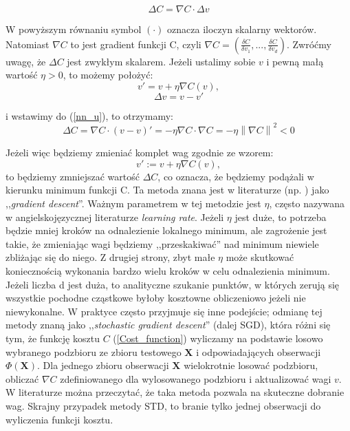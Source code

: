 \documentclass[licencjacka]{pracamgr}
\newcommand{\norm}[1]{\left\lVert#1\right\rVert}
\begin{document}
\begin{equation}
	\label{nn_u}
	\Delta C = \nabla C \cdot \Delta v
\end{equation}
 
W powyższym równaniu symbol $(\cdot)$ oznacza iloczyn skalarny wektorów. Natomiast $\nabla C$ to jest gradient funkcji C, czyli $\nabla C = (\frac{\delta C}{\delta v_{1}},...,\frac{\delta C}{\delta v_{d}} )$. Zwróćmy uwagę, że $\Delta C$ jest zwykłym skalarem. Jeżeli ustalimy sobie $v$ i pewną małą wartość $\eta>0$, to możemy położyć:
$$v' = v + \eta\nabla C(v), $$
$$ \Delta v = v - v'$$
 
i wstawimy do (\ref{nn_u}), to otrzymamy:
$$\Delta C = \nabla C\cdot (v - v)' = -\eta \nabla C\cdot\nabla C = -\eta\norm{\nabla C}^{2} < 0$$
 
Jeżeli więc będziemy zmieniać komplet wag zgodnie ze wzorem:
$$v':=v+\eta\nabla C(v),$$
to będziemy zmniejszać wartość $\Delta C$, co oznacza, że będziemy podążali w kierunku minimum funkcji C. Ta metoda znana jest w literaturze (np. \cite{nn}) jako ,,\textit{gradient descent}''. Ważnym parametrem w tej metodzie jest $\eta$, często nazywana w angielskojęzycznej literaturze \textit{learning rate}. Jeżeli $\eta$ jest duże, to potrzeba będzie mniej kroków na odnalezienie lokalnego minimum, ale zagrożenie jest takie, że zmieniając wagi będziemy ,,przeskakiwać'' nad minimum niewiele zbliżając się do niego. Z drugiej strony, zbyt małe $\eta$ może skutkować koniecznością wykonania bardzo wielu kroków w celu odnalezienia minimum.\\

Jeżeli liczba d jest duża, to analityczne szukanie punktów, w których zerują się wszystkie pochodne cząstkowe byłoby kosztowne obliczeniowo jeżeli nie niewykonalne. W praktyce często przyjmuje się inne podejście; odmianę tej metody znaną jako  ,,\textit{stochastic gradient descent}'' (dalej SGD), która różni się tym, że funkcję kosztu $C$ (\ref{Cost_function}) wyliczamy na podstawie losowo wybranego podzbioru ze zbioru testowego $\mathbf{X}$ i odpowiadających obserwacji $\Phi(\mathbf{X})$. Dla jednego zbioru obserwacji $\mathbf{X}$ wielokrotnie losować podzbioru, obliczać $\nabla C$ zdefiniowanego dla wylosowanego podzbioru i aktualizować wagi $v$. W literaturze można przeczytać, że taka metoda pozwala na skuteczne dobranie wag. Skrajny przypadek metody STD, to branie tylko jednej obserwacji do wyliczenia funkcji kosztu.\\
 
\end{document}
